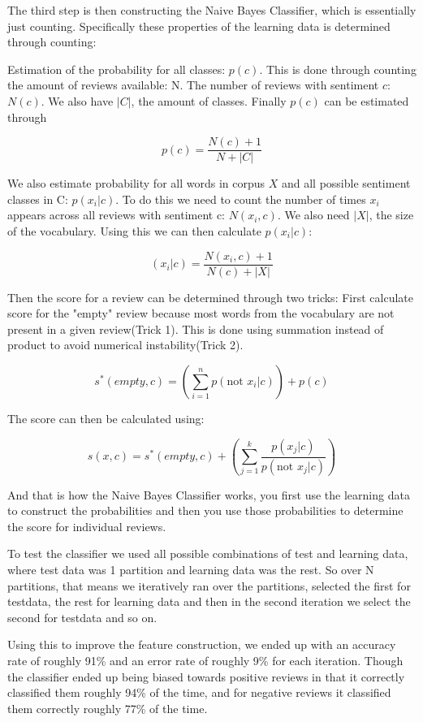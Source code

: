 	The third step is then constructing the Naive Bayes Classifier, which is essentially just counting. Specifically these properties of the learning data is determined through counting:
	
	Estimation of the probability for all classes: $p(c)$. This is done through counting the amount of reviews available: N. The number of reviews with sentiment $c$: $N(c)$. We also have $|C|$, the amount of classes. Finally $p(c)$ can be estimated through
	
	$$p(c) = \frac{N(c) + 1}{N +|C|}$$
	
	We also estimate probability for all words in corpus $X$ and all possible sentiment classes in C: $p(x_i | c)$. 
	To do this we need to count the number of times $x_i$ appears across all reviews with sentiment c: $N(x_i, c)$. We also need $|X|$, the size of the vocabulary. Using this we can then calculate $p(x_i|c)$:
	
	$$(x_i|c) = \frac{N(x_{i}, c) + 1}{N(c) + |X|}$$
	
	Then the score for a review can be determined through two tricks:
	First calculate score for the "empty" review because most words from the vocabulary are not present in a given review(Trick 1). This is done using summation instead of product to avoid numerical instability(Trick 2).
	
	$$s^{*}(empty, c) = (\sum\limits_{i=1}^{n} p(\text{not } x_i | c)) + p(c)$$
	
	The score can then be calculated using:
	
	$$s(x, c) = s^{*}(empty, c) + (\sum\limits_{j=1}^{k} \frac{p(x_{j}|c)}{p(\text{not } x_{j}|c)})$$
	
	And that is how the Naive Bayes Classifier works, you first use the learning data to construct the probabilities and then you use those probabilities to determine the score for individual reviews.
	
	To test the classifier we used all possible combinations of test and learning data, where test data was 1 partition and learning data was the rest. So over N partitions, that means we iteratively ran over the partitions, selected the first for testdata, the rest for learning data and then in the second iteration we select the second for testdata and so on.
	
	Using this to improve the feature construction, we ended up with an accuracy rate of roughly 91\% and an error rate of roughly 9\% for each iteration. Though the classifier ended up being biased towards positive reviews in that it correctly classified them roughly 94\% of the time, and for negative reviews it classified them correctly roughly 77\% of the time.
	
